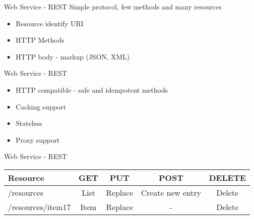\begin{frame}{Web Service - REST}
    Simple protocol, few methods and many resources
    \newline
    \begin{itemize}
      \item Resource identify URI
      \item HTTP Methods
      \item HTTP body - markup (JSON, XML)
    \end{itemize}
\end{frame}


\begin{frame}{Web Service - REST}
    \begin{itemize}
      \item HTTP compatible - safe and idempotent methods
      \item Caching support
      \item Stateless
      \item Proxy support
    \end{itemize}
\end{frame}


\begin{frame}{Web Service - REST}
\scriptsize
\begin{tabular}{ | l | c | c | c | c |  }
  \hline
  Resource & GET & PUT & POST & DELETE \\
  \hline
  /resources & List & Replace & Create new entry & Delete \\
  /resources/item17 & Item & Replace & - & Delete \\
  \hline
\end{tabular}
\end{frame}
